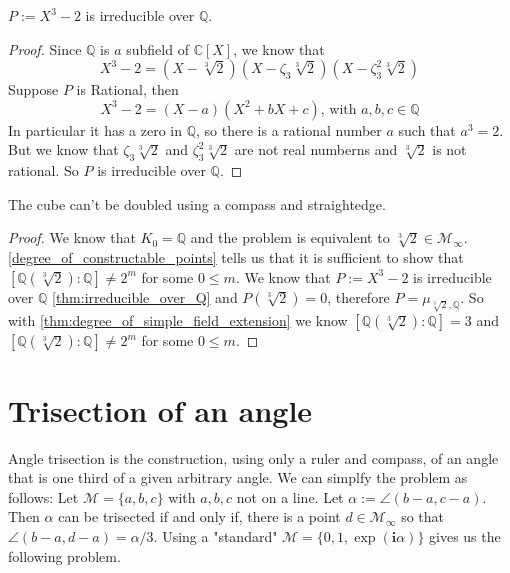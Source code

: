 \begin{theorem}
    $P := X^3 - 2$ is irreducible over $\mathbb{Q}$.
\label{thm:irreducible_over_Q}
\end{theorem}
\begin{proof}
    Since $\mathbb{Q}$ is $a$ subfield of $\mathbb{C} [X]$, we know that
    \begin{equation*}
        X^3 - 2 = (X - \sqrt[3]{2})(X -\zeta_3 \sqrt[3]{2})(X -\zeta_3^2 \sqrt[3]{2})
    \end{equation*}
    Suppose $P$ is Rational, then
    \begin{equation*}
        X^3 - 2 = (X - a)(X^2 + bX + c)\text{, with } a, b, c \in \mathbb{Q}
    \end{equation*}
    In particular it has a zero in $\mathbb{Q}$, so there is a rational number $a$ such that $a^3 = 2$.\newline
    But we know that $\zeta_3 \sqrt[3]{2}$ and $\zeta_3^2 \sqrt[3]{2}$ are not real numberns and $\sqrt[3]{2}$ is not rational.
    So $P$ is irreducible over $\mathbb{Q}$.
\end{proof}
\begin{theorem}
    The cube can't be doubled using a compass and straightedge.
\end{theorem}
\begin{proof}
    We know that $K_0 = \mathbb{Q}$ and the problem is equivalent to $\sqrt[3]{2} \in \mathcal{M}_{\infty}$.\newline
    \ref{degree_of_constructable_points} tells us that it is sufficient to show that $[\mathbb{Q}(\sqrt[3]{2}):\mathbb{Q}] \ne 2^m$ for some $0 \le m $.
    \newline
    We know that $P := X^3 - 2$ is irreducible over $\mathbb{Q}$ \ref{thm:irreducible_over_Q} and $P(\sqrt[3]{2}) = 0$, therefore $P = \mu_{\sqrt[3]{2},\mathbb{Q}}$.
    So with \ref{thm:degree_of_simple_field_extension} we know $[\mathbb{Q}(\sqrt[3]{2}):\mathbb{Q}] = 3$ and $[\mathbb{Q}(\sqrt[3]{2}):\mathbb{Q}] \ne 2^m$ for some $0 \le m $.
\end{proof}

\section{Trisection of an angle}
Angle trisection is the construction, using only a ruler and compass, of an angle that is one third of a given arbitrary angle.
We can simplfy the problem as follows:
Let $\mathcal{M} = \{a, b, c\}$ with $a, b, c$ not on a line. Let $\alpha := \angle (b - a, c - a) $.
Then $\alpha$ can be trisected if and only if, there is a point $d\in \mathcal{M}_{\infty}$ so that $\angle (b - a, d - a) = \alpha/3$. Using a
"standard" $\mathcal{M} = \{0,1,\exp(\textbf{i} \alpha)\}$ gives us the following problem.

